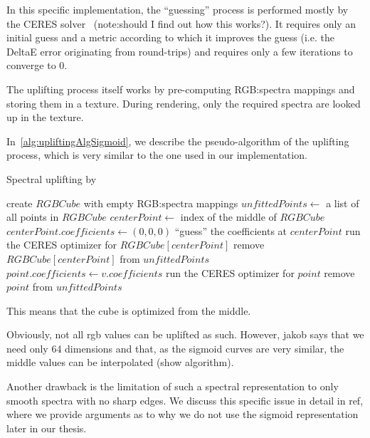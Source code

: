 In this specific implementation, the ``guessing'' process is performed mostly by the CERES solver~\cite{ceresSolver} (note:should I find out how this works?). It requires only an initial guess and a metric according to which it improves the guess (i.e. the DeltaE error originating from round-trips) and requires only a few iterations to converge to 0.

The uplifting process itself works by pre-computing RGB:spectra mappings and storing them in a texture. During rendering, only the required spectra are looked up in the texture.

In~\cref{alg:upliftingAlgSigmoid}, we describe the pseudo-algorithm of the uplifting process, which is very similar to the one used in our implementation.
\begin{algorithm}[t]
	\caption{Spectral uplifting by~\citet{upsamplingJakobHanika}}
	\label{alg:upliftingAlgSigmoid}
	\begin{algorithmic}[1]
		\State create $RGBCube$ with empty RGB:spectra mappings
		\State $unfittedPoints \gets$ a list of all points in $RGBCube$
		\State $centerPoint \gets$ index of the middle of $RGBCube$
		\Statex {}
		\State $centerPoint.coefficients \gets (0,0,0)$
		\Statex \Comment ``guess'' the coefficients at $centerPoint$
		\State run the CERES optimizer for $RGBCube[centerPoint]$
		\State remove $RGBCube[centerPoint]$ from $unfittedPoints$
		\State $point.coefficients \gets v.coefficients$
		\State run the CERES optimizer for $point$
		\State remove $point$ from $unfittedPoints$
		\EndIf
		\EndIf
		\EndFor
		\EndWhile
	\end{algorithmic}
\end{algorithm}

This means that the cube is optimized from the middle.

Obviously, not all rgb values can be uplifted as such. However, jakob says that we need only 64 dimensions and that, as the sigmoid curves are very similar, the middle values can be interpolated (show algorithm). 

Another drawback is the limitation of such a spectral representation to only smooth spectra with no sharp edges. We discuss this specific issue in detail in ref, where we provide arguments as to why we do not use the sigmoid representation later in our thesis.

